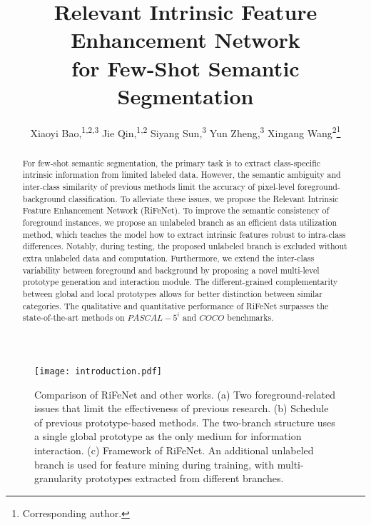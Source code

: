 \documentclass[letterpaper]{article} %
\title{Relevant Intrinsic Feature Enhancement Network\\
for Few-Shot Semantic Segmentation}
\author{
    Xiaoyi Bao,\equalcontrib\textsuperscript{\rm 1,\rm 2,\rm 3}
    Jie Qin,\equalcontrib\textsuperscript{\rm 1,\rm 2}
    Siyang Sun,\textsuperscript{\rm 3}
    Yun Zheng,\textsuperscript{\rm 3}
    Xingang Wang\textsuperscript{\rm 2}\thanks{Corresponding author.}
}
\begin{document}
\maketitle

\begin{abstract}
For few-shot semantic segmentation, the primary task is to extract class-specific intrinsic information from limited labeled data. However, the semantic ambiguity and inter-class similarity of previous methods limit the accuracy of pixel-level foreground-background classification. To alleviate these issues, we propose the Relevant Intrinsic Feature Enhancement Network (RiFeNet). To improve the semantic consistency of foreground instances, we propose an unlabeled branch as an efficient data utilization method, which teaches the model how to extract intrinsic features robust to intra-class differences. Notably, during testing, the proposed unlabeled branch is excluded without extra unlabeled data and computation. Furthermore, we extend the inter-class variability between foreground and background by proposing a novel multi-level prototype generation and interaction module. The different-grained complementarity between global and local prototypes allows for better distinction between similar categories. The qualitative and quantitative performance of RiFeNet surpasses the state-of-the-art methods on $PASCAL-5^i$ and $COCO$ benchmarks.

\end{abstract}

\begin{figure}[!t]
\centering
   \texttt{[image: introduction.pdf]}

   \caption{Comparison of RiFeNet and other works. (a) Two foreground-related issues that limit the effectiveness of previous research. (b) Schedule of previous prototype-based methods. The two-branch structure uses a single global prototype as the only medium for information interaction. (c) Framework of RiFeNet. An additional unlabeled branch is used for feature mining during training, with multi-granularity prototypes extracted from different branches. }
\label{introduction}
\end{figure}
\end{document}
